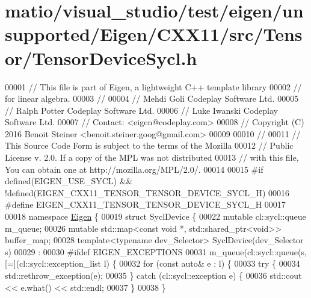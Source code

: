 \hypertarget{matio_2visual__studio_2test_2eigen_2unsupported_2_eigen_2_c_x_x11_2src_2_tensor_2_tensor_device_sycl_8h_source}{}\section{matio/visual\+\_\+studio/test/eigen/unsupported/\+Eigen/\+C\+X\+X11/src/\+Tensor/\+Tensor\+Device\+Sycl.h}
\label{matio_2visual__studio_2test_2eigen_2unsupported_2_eigen_2_c_x_x11_2src_2_tensor_2_tensor_device_sycl_8h_source}

\begin{DoxyCode}
00001 \textcolor{comment}{// This file is part of Eigen, a lightweight C++ template library}
00002 \textcolor{comment}{// for linear algebra.}
00003 \textcolor{comment}{//}
00004 \textcolor{comment}{// Mehdi Goli    Codeplay Software Ltd.}
00005 \textcolor{comment}{// Ralph Potter  Codeplay Software Ltd.}
00006 \textcolor{comment}{// Luke Iwanski  Codeplay Software Ltd.}
00007 \textcolor{comment}{// Contact: <eigen@codeplay.com>}
00008 \textcolor{comment}{// Copyright (C) 2016 Benoit Steiner <benoit.steiner.goog@gmail.com>}
00009 
00010 \textcolor{comment}{//}
00011 \textcolor{comment}{// This Source Code Form is subject to the terms of the Mozilla}
00012 \textcolor{comment}{// Public License v. 2.0. If a copy of the MPL was not distributed}
00013 \textcolor{comment}{// with this file, You can obtain one at http://mozilla.org/MPL/2.0/.}
00014 
00015 \textcolor{preprocessor}{#if defined(EIGEN\_USE\_SYCL) && !defined(EIGEN\_CXX11\_TENSOR\_TENSOR\_DEVICE\_SYCL\_H)}
00016 \textcolor{preprocessor}{#define EIGEN\_CXX11\_TENSOR\_TENSOR\_DEVICE\_SYCL\_H}
00017 
00018 \textcolor{keyword}{namespace }\hyperlink{namespace_eigen}{Eigen} \{
00019 \textcolor{keyword}{struct }SyclDevice \{
00022   \textcolor{keyword}{mutable} cl::sycl::queue m\_queue;
00026   \textcolor{keyword}{mutable} std::map<const void *, std::shared\_ptr<void>> buffer\_map;
00028   \textcolor{keyword}{template}<\textcolor{keyword}{typename} dev\_Selector> SyclDevice(dev\_Selector s)
00029   :
00030 #ifdef EIGEN\_EXCEPTIONS
00031   m\_queue(cl::sycl::queue(s, [=](cl::sycl::exception\_list l) \{
00032     \textcolor{keywordflow}{for} (\textcolor{keyword}{const} \textcolor{keyword}{auto}& e : l) \{
00033       \textcolor{keywordflow}{try} \{
00034         std::rethrow\_exception(e);
00035       \} \textcolor{keywordflow}{catch} (cl::sycl::exception e) \{
00036           std::cout << e.what() << std::endl;
00037         \}
00038     \}

\end{DoxyCode}
